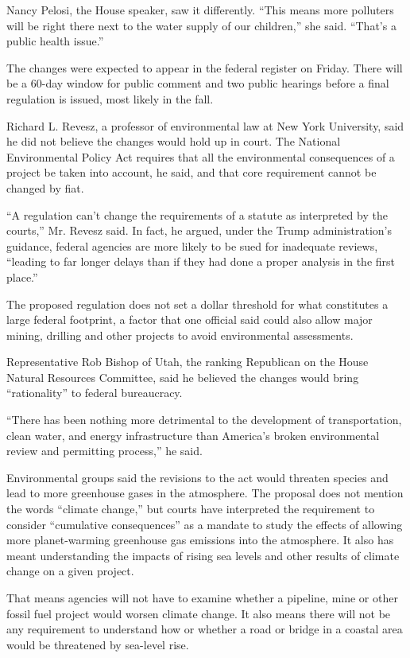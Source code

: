Nancy Pelosi, the House speaker, saw it differently. ``This means more
polluters will be right there next to the water supply of our
children,'' she said. ``That's a public health issue.''

The changes were expected to appear in the federal register on Friday.
There will be a 60-day window for public comment and two public hearings
before a final regulation is issued, most likely in the fall.

Richard L. Revesz, a professor of environmental law at New York
University, said he did not believe the changes would hold up in court.
The National Environmental Policy Act requires that all the
environmental consequences of a project be taken into account, he said,
and that core requirement cannot be changed by fiat.

``A regulation can't change the requirements of a statute as interpreted
by the courts,'' Mr. Revesz said. In fact, he argued, under the Trump
administration's guidance, federal agencies are more likely to be sued
for inadequate reviews, ``leading to far longer delays than if they had
done a proper analysis in the first place.''

The proposed regulation does not set a dollar threshold for what
constitutes a large federal footprint, a factor that one official said
could also allow major mining, drilling and other projects to avoid
environmental assessments.

Representative Rob Bishop of Utah, the ranking Republican on the House
Natural Resources Committee, said he believed the changes would bring
``rationality'' to federal bureaucracy.

``There has been nothing more detrimental to the development of
transportation, clean water, and energy infrastructure than America's
broken environmental review and permitting process,'' he said.

Environmental groups said the revisions to the act would threaten
species and lead to more greenhouse gases in the atmosphere. The
proposal does not mention the words ``climate change,'' but courts have
interpreted the requirement to consider ``cumulative consequences'' as a
mandate to study the effects of allowing more planet-warming greenhouse
gas emissions into the atmosphere. It also has meant understanding the
impacts of rising sea levels and other results of climate change on a
given project.

That means agencies will not have to examine whether a pipeline, mine or
other fossil fuel project would worsen climate change. It also means
there will not be any requirement to understand how or whether a road or
bridge in a coastal area would be threatened by sea-level rise.

